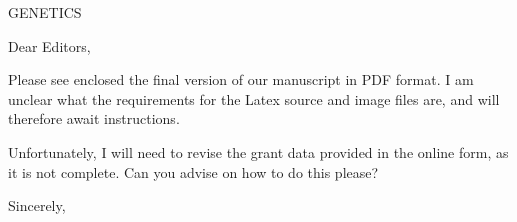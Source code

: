 \documentclass{letter}
\begin{document}
\begin{letter}{GENETICS}

\opening{Dear Editors,}

Please see enclosed the final version of our manuscript in PDF format.
I am unclear what the requirements for the Latex source and image
files are, and will therefore await instructions.

Unfortunately, I will need to revise the grant data provided in the
online form, as it is not complete. Can you advise on how to do this please?

\closing{Sincerely,}

\end{letter}
\end{document}
